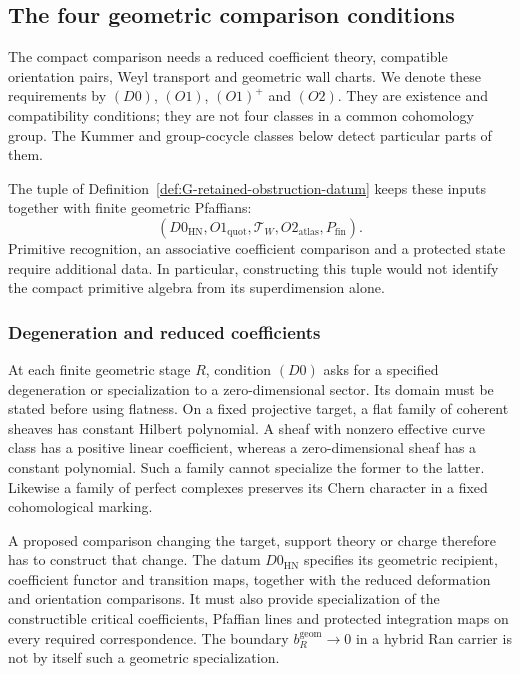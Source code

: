 \subsection{The four geometric comparison conditions}
\label{subsec:four-named-obstructions-ch5}

The compact comparison needs a reduced coefficient theory, compatible
orientation pairs, Weyl transport and geometric wall charts. We denote
these requirements by \((D0)\), \((O1)\), \((O1)^+\) and \((O2)\).
They are existence and compatibility conditions; they are not four
classes in a common cohomology group. The Kummer and group-cocycle
classes below detect particular parts of them.

The tuple of Definition~\ref{def:G-retained-obstruction-datum}
keeps these inputs together with finite geometric Pfaffians:
\[
 (D0_{\mathrm{HN}},O1_{\mathrm{quot}},\mathcal T_W,
       O2_{\mathrm{atlas}},P_{\mathrm{fin}}).
\]
Primitive recognition, an associative coefficient comparison and a
protected state require additional data. In particular, constructing
this tuple would not identify the compact primitive algebra from its
superdimension alone.

\subsubsection*{Degeneration and reduced coefficients}

At each finite geometric stage \(R\), condition \((D0)\) asks for a
specified degeneration or specialization to a zero-dimensional
sector. Its domain must be stated before using flatness. On a fixed
projective target, a flat family of coherent sheaves has constant
Hilbert polynomial. A sheaf with nonzero effective curve class has a
positive linear coefficient, whereas a zero-dimensional sheaf has a
constant polynomial. Such a family cannot specialize the former to
the latter. Likewise a family of perfect complexes preserves its
Chern character in a fixed cohomological marking.

A proposed comparison changing the target, support theory or charge
therefore has to construct that change. The datum
\(D0_{\mathrm{HN}}\) specifies its geometric recipient, coefficient
functor and transition maps, together with the reduced deformation
and orientation comparisons. It must also provide specialization of
the constructible critical coefficients, Pfaffian lines and protected
integration maps on every required correspondence. The boundary
\(b_R^{\mathrm{geom}}\to0\) in a hybrid Ran carrier is not by itself
such a geometric specialization.

